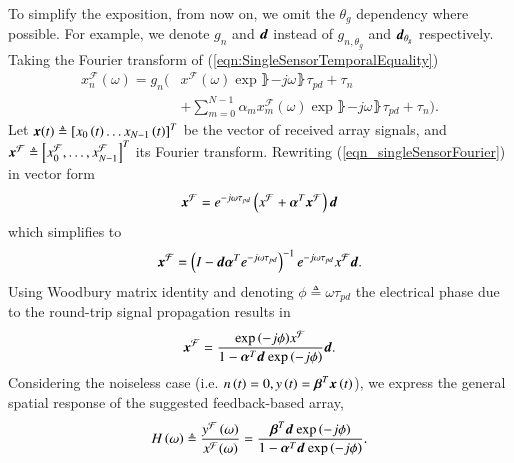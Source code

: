     To simplify the exposition, from now on, we omit the $\theta_{g}$ dependency where possible. For example, we denote $g_n$ and $\boldsymbol{d}$ instead of $g_{n,\theta_g}$ and $\boldsymbol{d}_{\theta_{g}}$ respectively. 
    Taking the Fourier transform of (\ref{eqn:SingleSensorTemporalEquality})
    \begin{equation}
        \label{eqn_singleSensorFourier}
            \begin{split}
                x_{n}^{\mathcal{F}}(\omega) =
                g_n\Bigg( & x^{\mathcal{F}}(\omega)
                \exp\rBrace{-j\omega\rBrace{\tau_{pd}+\tau_{n}}}
                \\&+\sum_{m=0}^{N-1}
                {
                \alpha_{m}x_{m}^{\mathcal{F}}(\omega)
                \exp\rBrace{-j\omega\rBrace{\tau_{pd}+\tau_{n}}}
                }\Bigg). 
            \end{split}
    \end{equation}
    Let $\boldsymbol{x}{\left({t}\right)}\triangleq\left[{x_{0}\left({t}\right)\hdots{}x_{N-1}\left({t}\right)}\right]^{T}$ be the vector of received array signals, and  $\boldsymbol{x}^{\mathcal{F}}\triangleq\left[{x_{0}^{\mathcal{F}},\hdots,x_{N-1}^{\mathcal{F}}}\right]^{T}$ its Fourier transform. Rewriting (\ref{eqn_singleSensorFourier}) in  vector form
    $$
    \boldsymbol{x}^{\mathcal{F}} = e^{-j\omega\tau_{pd}} \left({x^{\mathcal{F}}+\boldsymbol{\alpha}^{T} \boldsymbol{x}^{\mathcal{F}}}\right)\boldsymbol{d}
    $$
    which simplifies to
    $$
    \boldsymbol{x}^{\mathcal{F}} =\left({I-\boldsymbol{d}\boldsymbol{\alpha}^{T}{}e^{-j\omega\tau_{pd}}}\right)^{-1}e^{-j\omega\tau_{pd}}x^{\mathcal{F}} \boldsymbol{d} .
    $$
    Using Woodbury matrix identity \cite{woodbury1950inverting} and denoting $\phi\triangleq\omega\tau_{pd}$ the electrical phase due to the round-trip signal propagation results in
    $$
    \boldsymbol{x}^{\mathcal{F}}
    =
    \frac{    
    \exp{\left({-j\phi}\right)}x^{\mathcal{F}}
    }{
    1 - \boldsymbol{\alpha}^{T}\boldsymbol{d}_{}{}\exp{\left({-j\phi}\right)}
    }\boldsymbol{d}.
    $$
    Considering the noiseless case (i.e. $n\left({t}\right)=0, y\left({t}\right)=\boldsymbol{\beta}^{T}{}\boldsymbol{x}\left({t}\right)$),
    we express the general spatial response of the suggested feedback-based array, 
    \begin{equation}
    \label{eqn:GeneralFeedbackTransferFunction}
    H\rBrace{\omega} 
    \triangleq
    \frac{y^{\mathcal{F}}\rBrace{\omega}}{x^{\mathcal{F}}(\omega)} 
    =
    \frac{    
    \bTd{}\exp\rBrace{-j\phi}
    }{
    1 - \aTd{}\exp\rBrace{-j\phi}
    }.
    \end{equation}
